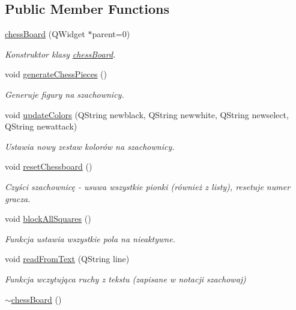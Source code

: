\subsection*{Public Member Functions}
\begin{DoxyCompactItemize}
\item 
\hyperlink{classchess_board_a3ffc09a4d95deaca0f6744ae25bb4f62}{chess\+Board} (Q\+Widget $\ast$parent=0)
\begin{DoxyCompactList}\small\item\em Konstruktor klasy \hyperlink{classchess_board}{chess\+Board}. \end{DoxyCompactList}\item 
void \hyperlink{classchess_board_a429d72a00c66352a9657cba0625c981b}{generate\+Chess\+Pieces} ()
\begin{DoxyCompactList}\small\item\em Generuje figury na szachownicy. \end{DoxyCompactList}\item 
void \hyperlink{classchess_board_abc343d0274a5d10c01934d3b1da56c1f}{update\+Colors} (Q\+String newblack, Q\+String newwhite, Q\+String newselect, Q\+String newattack)
\begin{DoxyCompactList}\small\item\em Ustawia nowy zestaw kolorów na szachownicy. \end{DoxyCompactList}\item 
void \hyperlink{classchess_board_ab8a0e470df04224d40a38f99fe4232bc}{reset\+Chessboard} ()
\begin{DoxyCompactList}\small\item\em Czyści szachownicę -\/ usuwa wszystkie pionki (również z listy), resetuje numer gracza. \end{DoxyCompactList}\item 
void \hyperlink{classchess_board_a3d7939233de9607a91357c3616f5db67}{block\+All\+Squares} ()
\begin{DoxyCompactList}\small\item\em Funkcja ustawia wszystkie pola na nieaktywne. \end{DoxyCompactList}\item 
void \hyperlink{classchess_board_a43133dc6f58be4b00cc54a7ba744f69a}{read\+From\+Text} (Q\+String line)
\begin{DoxyCompactList}\small\item\em Funkcja wczytująca ruchy z tekstu (zapisane w notacji szachowaj) \end{DoxyCompactList}\item 
\hyperlink{classchess_board_a91541e52c3b570ad4e06914786f33002}{$\sim$chess\+Board} ()
\end{DoxyCompactItemize}
